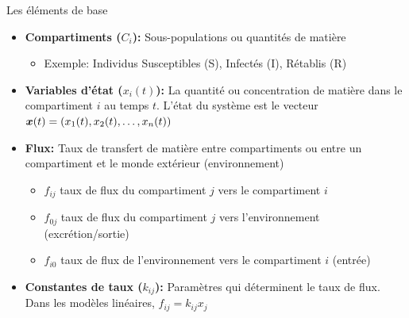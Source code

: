 \documentclass[aspectratio=169]{beamer}\usepackage[]{graphicx}\usepackage[]{xcolor}
\begin{document}
\begin{frame}{Les éléments de base}
    \begin{itemize}
        \item \textbf{Compartiments ($C_i$):} Sous-populations ou quantités de matière
        \begin{itemize}
            \item Exemple: Individus Susceptibles (S), Infectés (I), Rétablis (R)
        \end{itemize}
        \vfill
        \item \textbf{Variables d'état ($x_i(t)$):} La quantité ou concentration de matière dans le compartiment $i$ au temps $t$. L'état du système est le vecteur $\bm{x}(t) = (x_1(t), x_2(t), \dots, x_n(t))$
        \vfill
        \item \textbf{Flux:} Taux de transfert de matière entre compartiments ou entre un compartiment et le monde extérieur (environnement)
        \begin{itemize}
            \item $f_{ij}$ taux de flux du compartiment $j$ vers le compartiment $i$
            \item $f_{0j}$ taux de flux du compartiment $j$ vers l'environnement (excrétion/sortie)
            \item $f_{i0}$ taux de flux de l'environnement vers le compartiment $i$ (entrée)
        \end{itemize}
        \vfill
        \item \textbf{Constantes de taux ($k_{ij}$):} Paramètres qui déterminent le taux de flux. Dans les modèles linéaires, $f_{ij} = k_{ij} x_j$
    \end{itemize}
\end{frame}
\end{document}
